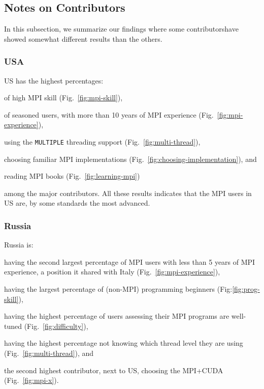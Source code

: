\documentclass[preprint,5p,times]{elsarticle}
\def\country{contributor\xspace{}}%
\def\countries{contributors\xspace{}}%
\def\Countries{Contributors\xspace{}}%
\def\mcountries{major contributors\xspace{}}%
\begin{document}
\subsection{Notes on \Countries}

In this subsection, we summarize our findings where some \countries have showed
somewhat different results than the others.

\subsubsection*{USA}

US has the highest percentages:
\begin{enumerate*}
\item of high MPI skill (Fig.~\ref{fig:mpi-skill}),
\item of seasoned users, with more than 10 years of MPI experience (Fig.~\ref{fig:mpi-experience}),
\item using the {\tt MULTIPLE} threading support
  (Fig.~\ref{fig:multi-thread}),
\item choosing familiar MPI implementations
  (Fig.~\ref{fig:choosing-implementation}), and
\item reading MPI books (Fig.~\ref{fig:learning-mpi})
\end{enumerate*}
among the \mcountries. All these results indicates that the MPI
users in US are, by some standards the most advanced.

\subsubsection*{Russia}

Russia is:
\begin{enumerate*}
\item having the second largest percentage of MPI users with less than 5
  years of MPI experience, a position it shared with Italy
  (Fig.~\ref{fig:mpi-experience}),
\item having the largest percentage of (non-MPI) programming beginners
  (Fig:\ref{fig:prog-skill}),
\item having the highest percentage of users assessing their MPI programs are
  well-tuned (Fig.~\ref{fig:difficulty}),
\item having the highest percentage not knowing which thread level
  they are using (Fig.~\ref{fig:multi-thread}), and
\item the second highest \country, next to US, choosing the MPI+CUDA
  (Fig.~\ref{fig:mpi-x}).
\end{enumerate*}
\end{document}
